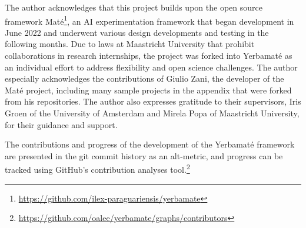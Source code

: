 The author acknowledges that this project builds upon the open source framework Maté\footnote{\url{https://github.com/ilex-paraguariensis/yerbamate}}, an AI experimentation framework that began development in June 2022 and underwent various design developments and testing in the following months. Due to laws at Maastricht University that prohibit collaborations in research internships, the project was forked into Yerbamaté as an individual effort to address flexibility and open science challenges. The author especially acknowledges the contributions of Giulio Zani, the developer of the Maté project, including many sample projects in the appendix that were forked from his repositories. 
The author also expresses gratitude to their supervisors, Iris Groen of the University of Amsterdam and Mirela Popa of Maastricht University, for their guidance and support. 

The contributions and progress of the development of the Yerbamaté framework are presented in the git commit history as an alt-metric, and progress can be tracked using GitHub's contribution analyses tool.\footnote{\url{https://github.com/oalee/yerbamate/graphs/contributors}}



